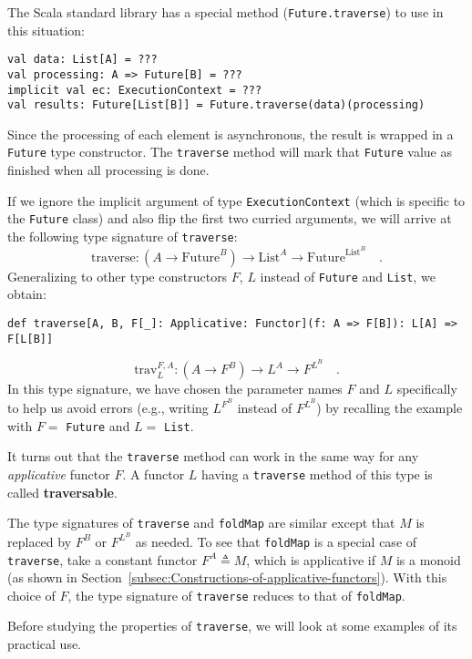 The Scala standard library has a special method (\lstinline!Future.traverse!)
to use in this situation:
\begin{lstlisting}
val data: List[A] = ???
val processing: A => Future[B] = ???
implicit val ec: ExecutionContext = ???
val results: Future[List[B]] = Future.traverse(data)(processing)
\end{lstlisting}
Since the processing of each element is asynchronous, the result is
wrapped in a \lstinline!Future! type constructor. The \lstinline!traverse!
method will mark that \lstinline!Future! value as finished when all
processing is done.

If we ignore the implicit argument of type \lstinline!ExecutionContext!
(which is specific to the \lstinline!Future! class) and also flip
the first two curried arguments, we will arrive at the following type
signature of \lstinline!traverse!:\vspace{-0.5\baselineskip}
\[
\text{traverse}:(A\rightarrow\text{Future}^{B})\rightarrow\text{List}^{A}\rightarrow\text{Future}^{\text{List}^{B}}\quad.
\]
Generalizing to other type constructors $F$, $L$ instead of \lstinline!Future!
and \lstinline!List!, we obtain:
\begin{lstlisting}
def traverse[A, B, F[_]: Applicative: Functor](f: A => F[B]): L[A] => F[L[B]]
\end{lstlisting}
\[
\text{trav}_{L}^{F,A}:(A\rightarrow F^{B})\rightarrow L^{A}\rightarrow F^{L^{B}}\quad.
\]
In this type signature, we have chosen the parameter names $F$ and
$L$ specifically to help us avoid errors (e.g., writing $L^{F^{B}}$
instead of $F^{L^{B}}$) by recalling the example with $F=$ \lstinline!Future!
and $L=$ \lstinline!List!.

It turns out that the \lstinline!traverse! method can work in the
same way for any \emph{applicative} functor $F$. A functor $L$ having
a \lstinline!traverse! method of this type is called \textbf{traversable}.

The type signatures of \lstinline!traverse! and \lstinline!foldMap!
are similar except that $M$ is replaced by $F^{B}$ or $F^{L^{B}}$
as needed. To see that \lstinline!foldMap! is a special case of \lstinline!traverse!,
take a constant functor $F^{A}\triangleq M$, which is applicative
if $M$ is a monoid (as shown in Section~\ref{subsec:Constructions-of-applicative-functors}).
With this choice of $F$, the type signature of \lstinline!traverse!
reduces to that of \lstinline!foldMap!.

Before studying the properties of \lstinline!traverse!, we will look
at some examples of its practical use.

